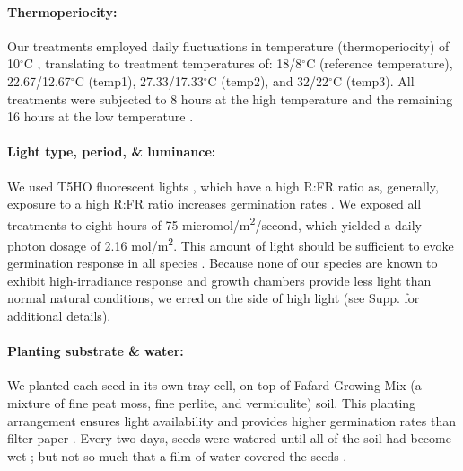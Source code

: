 \documentclass[11pt]{article}\usepackage[]{graphicx}\usepackage[]{color}
\begin{document}
	\paragraph{Thermoperiocity:} Our treatments employed daily fluctuations in temperature (thermoperiocity) of 10$^\circ$C \parencite[see e.g.,][]{Steinbauer1957, Toole1963,ISTA1954}, translating to treatment temperatures of: 18/8$^\circ$C (reference temperature), 22.67/12.67$^\circ$C (temp1), 27.33/17.33$^\circ$C (temp2), and 32/22$^\circ$C (temp3). All treatments were subjected to 8 hours at the high temperature and the remaining 16 hours at the low temperature \parencite{Baskin1998,Roberts1981,Popay1970,Probert2000}. %

	\paragraph{Light type, period, \& luminance:} We used T5HO fluorescent lights \parencite{Toole1963}, which have a high R:FR ratio as, generally, exposure to a high R:FR ratio increases germination rates \parencite[though some studies find germination requires high R:FR ratio or is insensitive,][]{Popay1970,Pons2000,Wulff1994}. %
We exposed all treatments to eight hours \parencite[coinciding with the higher temperature,][]{Baskin1998} of 75 micromol/m\textsuperscript{2}/second, which yielded a daily photon dosage of 2.16 mol/m\textsuperscript{2}. This amount of light should be sufficient to evoke germination response in all species \parencite{Pons1991}. Because none of our species are known to exhibit high-irradiance response and  growth chambers provide less light than normal natural conditions, we erred on the side of high light (see Supp. for additional details). 
	
	\paragraph{Planting substrate \& water:} We planted each seed in its own tray cell, on top of Fafard Growing Mix (a mixture of fine peat moss, fine perlite, and vermiculite) soil. This planting arrangement ensures light availability \parencite{Tester1987} and provides higher germination rates than filter paper \parencite{Andrews1974}. Every two days, seeds were watered until all of the soil had become wet \parencite{Steinbauer1957}; but not so much that a film of water covered the seeds \parencite{AOSA1960}.
	
\end{document}
